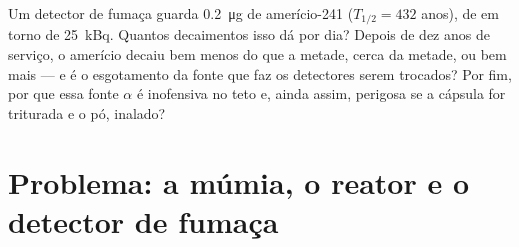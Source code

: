 \begin{exercise}[$\star\star\star$]\label{exo:g11:nucleus-radioactivity:15}
Um detector de fumaça guarda \qty{0.2}{\micro\gram} de amerício-241
($T_{1/2} = 432$ anos), de  em torno de \qty{25}{kBq}. Quantos
decaimentos isso dá por dia? Depois de dez anos de serviço, o amerício
decaiu bem menos do que a metade, cerca da metade, ou bem mais --- e é o
esgotamento da fonte que faz os detectores serem trocados? Por fim, por
que essa fonte $\alpha$ é inofensiva no teto e, ainda assim, perigosa se
a cápsula for triturada e o pó, inalado?
\end{exercise}

\section{Problema: a múmia, o reator e o detector de fumaça}

